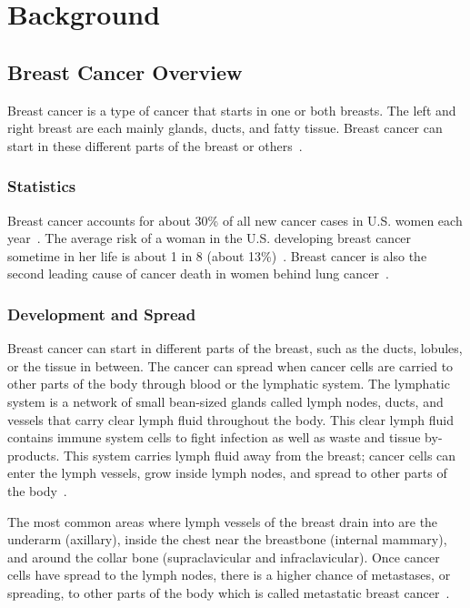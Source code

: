 \newpage
\section{Background\label{introduction:background}}

\subsection{Breast Cancer Overview\label{sec:introduction:breastcanceroverview}}
Breast cancer is a type of cancer that starts in one or both breasts. The left and right breast are each mainly glands, ducts, and fatty tissue. Breast cancer can start in these different parts of the breast or others~\cite{RefWorks:RefID:36-american2021breast}.

\subsubsection{Statistics\label{sec:introduction:breastcancer:statistics}}
Breast cancer accounts for about 30\% of all new cancer cases in U.S. women each year~\cite{RefWorks:RefID:150-2025breast}. The average risk of a woman in the U.S. developing breast cancer sometime in her life is about 1 in 8 (about 13\%)~\cite{RefWorks:RefID:36-american2021breast}. Breast cancer is also the second leading cause of cancer death in women behind lung cancer~\cite{RefWorks:RefID:36-american2021breast}.

\subsubsection{Development and Spread\label{sec:introduction:breastcancer:developmentandspread}}
Breast cancer can start in different parts of the breast, such as the ducts, lobules, or the tissue in between. The cancer can spread when cancer cells are carried to other parts of the body through blood or the lymphatic system. The lymphatic system is a network of small bean-sized glands called lymph nodes, ducts, and vessels that carry clear lymph fluid throughout the body. This clear lymph fluid contains immune system cells to fight infection as well as waste and tissue by-products. This system carries lymph fluid away from the breast; cancer cells can enter the lymph vessels, grow inside lymph nodes, and spread to other parts of the body~\cite{RefWorks:RefID:36-american2021breast}.

The most common areas where lymph vessels of the breast drain into are the underarm (axillary), inside the chest near the breastbone (internal mammary), and around the collar bone (supraclavicular and infraclavicular). Once cancer cells have spread to  the lymph nodes, there is a higher chance of metastases, or spreading, to other parts of the body which is called metastatic breast cancer~\cite{RefWorks:RefID:36-american2021breast}.

